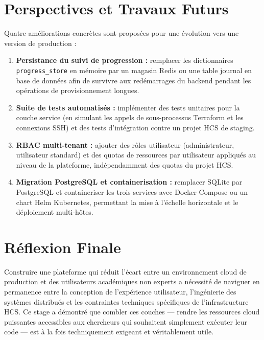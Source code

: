 \section*{Perspectives et Travaux Futurs}

Quatre améliorations concrètes sont proposées pour une évolution vers une version de
production :

\begin{enumerate}
  \item \textbf{Persistance du suivi de progression :} remplacer les dictionnaires
        \texttt{progress\_store} en mémoire par un magasin Redis ou une table journal
        en base de données afin de survivre aux redémarrages du backend pendant les
        opérations de provisionnement longues.
  \item \textbf{Suite de tests automatisés :} implémenter des tests unitaires pour
        la couche service (en simulant les appels de sous-processus Terraform et les
        connexions SSH) et des tests d'intégration contre un projet HCS de staging.
  \item \textbf{RBAC multi-tenant :} ajouter des rôles utilisateur (administrateur,
        utilisateur standard) et des quotas de ressources par utilisateur appliqués
        au niveau de la plateforme, indépendamment des quotas du projet HCS.
  \item \textbf{Migration PostgreSQL et containerisation :} remplacer SQLite par
        PostgreSQL et containeriser les trois services avec Docker Compose ou un chart
        Helm Kubernetes, permettant la mise à l'échelle horizontale et le déploiement
        multi-hôtes.
\end{enumerate}

\section*{Réflexion Finale}

Construire une plateforme qui réduit l'écart entre un environnement cloud de production
et des utilisateurs académiques non experts a nécessité de naviguer en permanence entre
la conception de l'expérience utilisateur, l'ingénierie des systèmes distribués et
les contraintes techniques spécifiques de l'infrastructure HCS. Ce stage a démontré
que combler ces couches --- rendre les ressources cloud puissantes accessibles aux
chercheurs qui souhaitent simplement exécuter leur code --- est à la fois
techniquement exigeant et véritablement utile.
